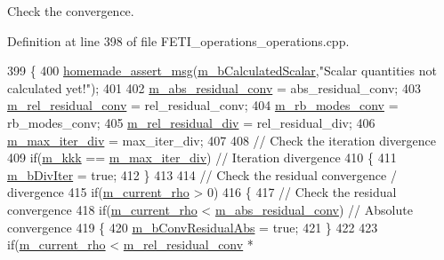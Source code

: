 Check the convergence. 



Definition at line 398 of file F\+E\+T\+I\+\_\+operations\+\_\+operations.\+cpp.


\begin{DoxyCode}
399 \{
400     \hyperlink{common__header_8h_a593ccc80b790b2268653fcf6597bf451}{homemade\_assert\_msg}(\hyperlink{classcarl_1_1_f_e_t_i___operations_a2e115c189d8adcfc8451c505a3a9cb05}{m\_bCalculatedScalar},\textcolor{stringliteral}{"Scalar quantities not
       calculated yet!"});
401 
402     \hyperlink{classcarl_1_1_f_e_t_i___operations_af8d1551035cbf80cc068d096c64e2ca8}{m\_abs\_residual\_conv} = abs\_residual\_conv;
403     \hyperlink{classcarl_1_1_f_e_t_i___operations_a4d1bd14942397cc0cf91c4625f7482da}{m\_rel\_residual\_conv} = rel\_residual\_conv;
404     \hyperlink{classcarl_1_1_f_e_t_i___operations_a4e5cf9147182d2647b6379453a4ff10d}{m\_rb\_modes\_conv} = rb\_modes\_conv;
405     \hyperlink{classcarl_1_1_f_e_t_i___operations_ae5050693b56d9bc3a3794014485fcf04}{m\_rel\_residual\_div} = rel\_residual\_div;
406     \hyperlink{classcarl_1_1_f_e_t_i___operations_ab8f236399e5565019be7dc8825bc00df}{m\_max\_iter\_div} = max\_iter\_div;
407 
408     \textcolor{comment}{// Check the iteration divergence}
409     \textcolor{keywordflow}{if}(\hyperlink{classcarl_1_1_f_e_t_i___operations_aae9d8e6d2d0436cda061359f1602b096}{m\_kkk} == \hyperlink{classcarl_1_1_f_e_t_i___operations_ab8f236399e5565019be7dc8825bc00df}{m\_max\_iter\_div}) \textcolor{comment}{// Iteration divergence}
410     \{
411         \hyperlink{classcarl_1_1_f_e_t_i___operations_a7b94d72a58cd40af15151c28147ceb96}{m\_bDivIter} = \textcolor{keyword}{true};
412     \}
413 
414     \textcolor{comment}{// Check the residual convergence / divergence}
415     \textcolor{keywordflow}{if}(\hyperlink{classcarl_1_1_f_e_t_i___operations_a1ecd729d4399772a6741c3b4bf69a69a}{m\_current\_rho} > 0)
416     \{
417         \textcolor{comment}{// Check the residual convergence}
418         \textcolor{keywordflow}{if}(\hyperlink{classcarl_1_1_f_e_t_i___operations_a1ecd729d4399772a6741c3b4bf69a69a}{m\_current\_rho} < \hyperlink{classcarl_1_1_f_e_t_i___operations_af8d1551035cbf80cc068d096c64e2ca8}{m\_abs\_residual\_conv}) \textcolor{comment}{// Absolute convergence}
419         \{
420             \hyperlink{classcarl_1_1_f_e_t_i___operations_a06ed6c8995fd004aabe207d2a961029e}{m\_bConvResidualAbs} = \textcolor{keyword}{true};
421         \}
422 
423         \textcolor{keywordflow}{if}(\hyperlink{classcarl_1_1_f_e_t_i___operations_a1ecd729d4399772a6741c3b4bf69a69a}{m\_current\_rho} < \hyperlink{classcarl_1_1_f_e_t_i___operations_a4d1bd14942397cc0cf91c4625f7482da}{m\_rel\_residual\_conv} * 

\end{DoxyCode}
